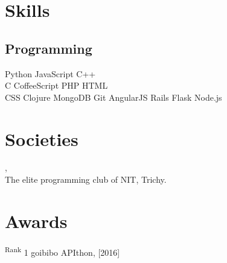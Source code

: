 \documentclass[]{deedy-resume-openfont}
\begin{document}
\begin{minipage}[t]{0.33\textwidth}

\section{Skills}
\subsection{Programming}
Python \textbullet{} JavaScript \textbullet{} C++ \\
\textbullet{} C \textbullet{} CoffeeScript \textbullet{} PHP \textbullet{} HTML \\ \textbullet{}  CSS  \textbullet{} Clojure \textbullet{} MongoDB \textbullet{} Git \textbullet{} AngularJS \textbullet{} Rails \textbullet{} Flask \textbullet{} Node.js
\sectionsep

\section{Societies} 
{\href{https://github.com/delta}{}},\\ The elite programming club of NIT, Trichy.
\sectionsep

\section{Awards} 
\textsuperscript {Rank }1 goibibo APIthon, [2016]\\
\sectionsep

%
%

\end{minipage} 
\hfill
\end{document}
